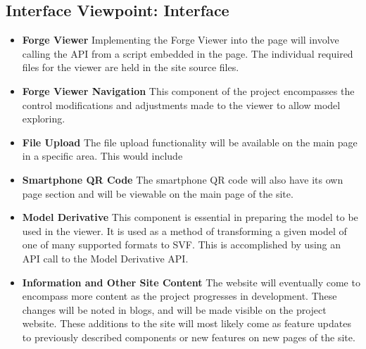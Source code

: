 \documentclass[letterpaper, 10pt, draftclsnofoot, compsoc, onecolumn]{IEEEtran}
\begin{document}
\subsection{Interface Viewpoint: Interface}
\begin{itemize}
	 \item[]\textbf{Forge Viewer} Implementing the Forge Viewer into the page will involve calling the API from a script embedded in the page. The individual required files for the viewer are held in the site source files.
	
	\item[]\textbf{Forge Viewer Navigation} This component of the project encompasses the control modifications and adjustments made to the viewer to allow model exploring.
	 
	\item[]\textbf{File Upload} The file upload functionality will be available on the main page in a specific area. This would include 
	
	\item[]\textbf{Smartphone QR Code}  The smartphone QR code will also have its own page section and will be viewable on the main page of the site.
	
	\item[]\textbf{Model Derivative} This component is essential in preparing the model to be used in the viewer. It is used as a method of transforming a given model of one of many supported formats to SVF. This is accomplished by using an API call to the Model Derivative API.
	
	\item[]\textbf{Information and Other Site Content} The website will eventually come to encompass more content as the project progresses in development. These changes will be noted in blogs, and will be made visible on the project website. These additions to the site will most likely come as feature updates to previously described components or new features on new pages of the site.	
\end{itemize}
\end{document}
